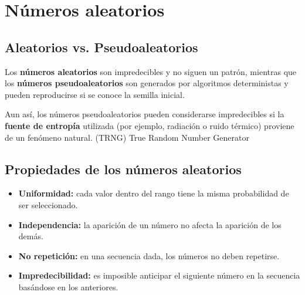 \documentclass[11pt,a4paper]{article}
\begin{document}
\section{Números aleatorios}

\subsection{Aleatorios vs. Pseudoaleatorios}

Los \textbf{números aleatorios} son impredecibles y no siguen un patrón, mientras que los \textbf{números pseudoaleatorios} son generados por algoritmos deterministas y pueden reproducirse si se conoce la semilla inicial.

Aun así, los números pseudoaleatorios pueden considerarse impredecibles si la \textbf{fuente de entropía} utilizada (por ejemplo, radiación o ruido térmico) proviene de un fenómeno natural. (TRNG) True Random Number Generator

\subsection{Propiedades de los números aleatorios}

\begin{itemize}
    \item \textbf{Uniformidad:} cada valor dentro del rango tiene la misma probabilidad de ser seleccionado.
    \item \textbf{Independencia:} la aparición de un número no afecta la aparición de los demás.
    \item \textbf{No repetición:} en una secuencia dada, los números no deben repetirse.
    \item \textbf{Impredecibilidad:} es imposible anticipar el siguiente número en la secuencia basándose en los anteriores.
\end{itemize}
\end{document}
